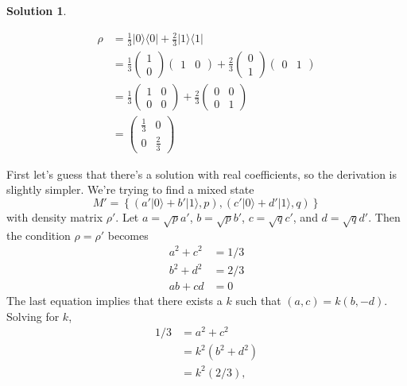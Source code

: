\documentclass{article}
\theoremstyle{definition}
\newtheorem*{solution}{Solution}
\newcommand{\ket}[1]{|#1\rangle}
\newcommand{\bra}[1]{\langle#1|}
\begin{document}
\begin{solution}
\begin{compactenum}[(a)]
\item
\begin{align*}
\rho & = \frac{1}{3} \ket{0}\bra{0} + \frac{2}{3} \ket{1}\bra{1} 
\\ & = \frac{1}{3} \begin{pmatrix}
                                1  \\
                                0 
                              \end{pmatrix}
                              \begin{pmatrix} 
                                1  & 0
                              \end{pmatrix}
  + \frac{2}{3} \begin{pmatrix}
                                 0 \\ 
                                 1
                         \end{pmatrix} 
                         \begin{pmatrix}
                           0 & 1
                         \end{pmatrix}
\\ & = \frac{1}{3} \begin{pmatrix}
                                1 & 0 \\
                                0 & 0
                              \end{pmatrix}
     + \frac{2}{3} \begin{pmatrix}
                             0 & 0 \\
                             0 & 1
                          \end{pmatrix} 
\\ & = \begin{pmatrix}
               \frac{1}{3} & 0 \\
               0 & \frac{2}{3}
           \end{pmatrix}
\end{align*}

\item  First let's guess that there's a solution with real coefficients, so the derivation is slightly simpler. We're trying to find a mixed state
$$M' = \left\{ \left(a' \ket{0} + b' \ket{1}, p \right), \left(c' \ket{0} + d' \ket{1}, q \right)\right\}$$
with density matrix $\rho'$.
Let $a = \sqrt{p} a'$, $b = \sqrt{p} b'$, $c = \sqrt{q} c'$, and $d = \sqrt{q} d'$.
Then the condition $\rho = \rho'$ becomes
\begin{align*}
a^2 + c^2 & = 1/3
\\ b^2 + d^2 & = 2/3
\\ ab + cd & = 0
\end{align*}
The last equation implies that there exists a $k$ such that $(a,c) = k (b, -d)$.  Solving for $k$,
\begin{align*}
1/3 & = a^2 + c^2
\\ & = k^2 (b^2 + d^2)
\\ & = k^2 (2/3),
\end{align*}


\end{compactenum}
\end{solution}
\end{document}
